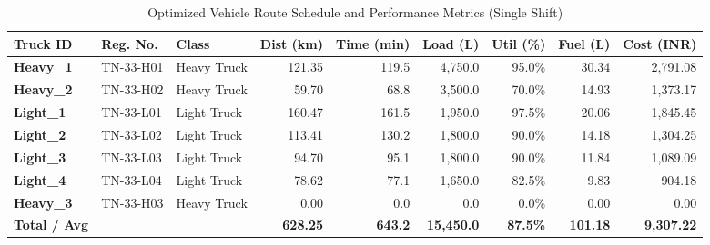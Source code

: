 \documentclass[11pt,a4paper]{article}
\begin{document}
\begin{table}[H]
\centering
\small
\caption{Optimized Vehicle Route Schedule and Performance Metrics (Single Shift)}
\label{tab:routes}
\begin{tabularx}{\textwidth}{l l l r r r r r r}
\toprule
\textbf{Truck ID} & \textbf{Reg. No.} & \textbf{Class} & \textbf{Dist (km)} & \textbf{Time (min)} & \textbf{Load (L)} & \textbf{Util (\%)} & \textbf{Fuel (L)} & \textbf{Cost (INR)} \\
\midrule
\textbf{Heavy\_1} & TN-33-H01 & Heavy Truck & 121.35 & 119.5 & 4,750.0 & 95.0\% & 30.34 & 2,791.08 \\
\textbf{Heavy\_2} & TN-33-H02 & Heavy Truck & 59.70 & 68.8 & 3,500.0 & 70.0\% & 14.93 & 1,373.17 \\
\textbf{Light\_1} & TN-33-L01 & Light Truck & 160.47 & 161.5 & 1,950.0 & 97.5\% & 20.06 & 1,845.45 \\
\textbf{Light\_2} & TN-33-L02 & Light Truck & 113.41 & 130.2 & 1,800.0 & 90.0\% & 14.18 & 1,304.25 \\
\textbf{Light\_3} & TN-33-L03 & Light Truck & 94.70 & 95.1 & 1,800.0 & 90.0\% & 11.84 & 1,089.09 \\
\textbf{Light\_4} & TN-33-L04 & Light Truck & 78.62 & 77.1 & 1,650.0 & 82.5\% & 9.83 & 904.18 \\
\textbf{Heavy\_3} & TN-33-H03 & Heavy Truck & 0.00 & 0.0 & 0.0 & 0.0\% & 0.00 & 0.00 \\
\midrule
\textbf{Total / Avg} & & & \textbf{628.25} & \textbf{643.2} & \textbf{15,450.0} & \textbf{87.5\%} & \textbf{101.18} & \textbf{9,307.22} \\
\bottomrule
\end{tabularx}
\end{table}
\end{document}
